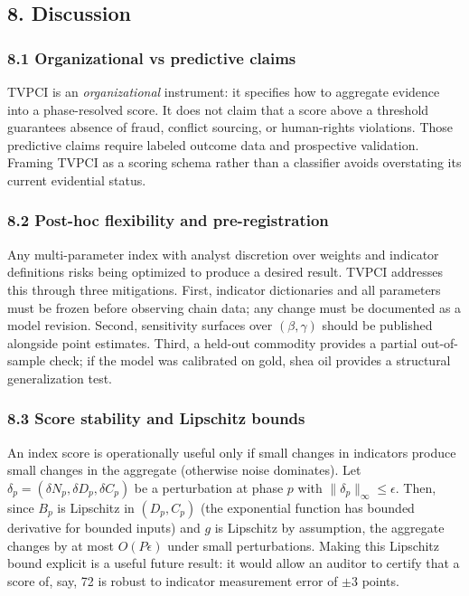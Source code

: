 \documentclass[
  11pt,
  letterpaper,
]{article}
\begin{document}
\subsection{8. Discussion}\label{discussion}

\subsubsection{8.1 Organizational vs predictive
claims}\label{organizational-vs-predictive-claims}

TVPCI is an \emph{organizational} instrument: it specifies how to
aggregate evidence into a phase-resolved score. It does not claim that a
score above a threshold guarantees absence of fraud, conflict sourcing,
or human-rights violations. Those predictive claims require labeled
outcome data and prospective validation. Framing TVPCI as a scoring
schema rather than a classifier avoids overstating its current
evidential status.

\subsubsection{8.2 Post-hoc flexibility and
pre-registration}\label{post-hoc-flexibility-and-pre-registration}

Any multi-parameter index with analyst discretion over weights and
indicator definitions risks being optimized to produce a desired result.
TVPCI addresses this through three mitigations. First, indicator
dictionaries and all parameters must be frozen before observing chain
data; any change must be documented as a model revision. Second,
sensitivity surfaces over \((\beta, \gamma)\) should be published
alongside point estimates. Third, a held-out commodity provides a
partial out-of-sample check; if the model was calibrated on gold, shea
oil provides a structural generalization test.

\subsubsection{8.3 Score stability and Lipschitz
bounds}\label{score-stability-and-lipschitz-bounds}

An index score is operationally useful only if small changes in
indicators produce small changes in the aggregate (otherwise noise
dominates). Let \(\delta_p = (\delta N_p, \delta D_p, \delta C_p)\) be a
perturbation at phase \(p\) with \(\|\delta_p\|_\infty \leq \epsilon\).
Then, since \(B_p\) is Lipschitz in \((D_p, C_p)\) (the exponential
function has bounded derivative for bounded inputs) and \(g\) is
Lipschitz by assumption, the aggregate changes by at most
\(O(P \epsilon)\) under small perturbations. Making this Lipschitz bound
explicit is a useful future result: it would allow an auditor to certify
that a score of, say, 72 is robust to indicator measurement error of
\(\pm 3\) points.
\end{document}
